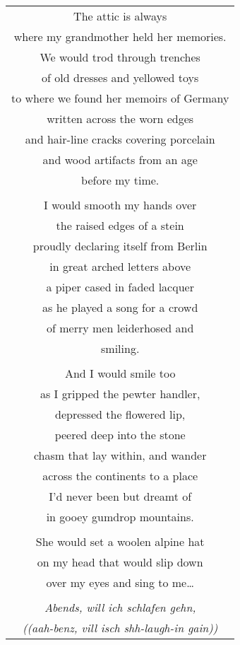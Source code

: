\documentclass{article}
\begin{document}
\begin{center}
\begin{tabular}{c}
\\
The attic is always \\
where my grandmother held her memories. \\
We would trod through trenches \\
of old dresses and yellowed toys \\
to where we found her memoirs of Germany \\
written across the worn edges \\
and hair-line cracks covering porcelain \\
and wood artifacts from an age \\
before my time. \\
\\
I would smooth my hands over \\
the raised edges of a stein \\
proudly declaring itself from Berlin \\
in great arched letters above \\
a piper cased in faded lacquer \\
as he played a song for a crowd \\
of merry men leiderhosed and \\
smiling. \\
\\
And I would smile too \\
as I gripped the pewter handler, \\
depressed the flowered lip, \\
peered deep into the stone \\
chasm that lay within, and wander \\
across the continents to a place \\
I'd never been but dreamt of \\
in gooey gumdrop mountains. \\
\\
She would set a woolen alpine hat \\
on my head that would slip down \\
over my eyes and sing to me\ldots{} \\
\\
\textit{Abends, will ich schlafen gehn,} \\
{\scriptsize\textit{((aah-benz, vill isch shh-laugh-in gain))}} \\

\end{tabular}
\end{center}
\end{document}
